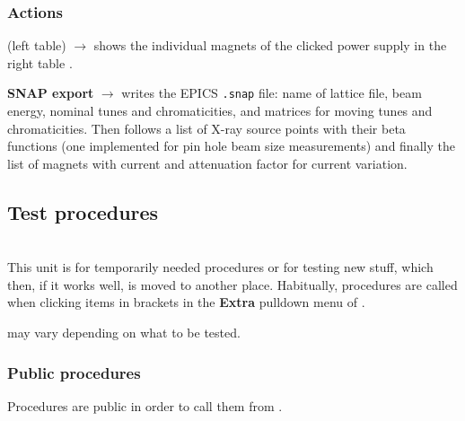 \documentclass[12pt]{article}
\newcommand\code[1]{{\tt #1}}
\newcommand{\ofld}[1]{\colorbox{black!15}{{{\color{black}\bf #1}}}}
\newcommand{\ofldx}[1]{\colorbox{black!15}{{\color{black}(#1)}}}
\newcommand\guico[1]{{\color{blue}\code{#1}}}
\newcommand{\evcod}[2]{\ofld{#1} $\rightarrow$ \guico{#2}}
\newcommand{\evcodx}[2]{\ofldx{#1} $\rightarrow$ \guico{#2}}
\newcommand{\opauni}[1]{\colorbox{orange!30}{{\color{black}\code{#1}}}}
\newcommand{\ounih}[2]{\subsection{\label{#2}#1}{\Huge\opauni{#2}}\\}
\newcommand{\ouni}[1]{\hyperref[#1]{\opauni{#1}}}
\newcommand{\uses}[1]{\flushleft {\bf Uses:} #1}
\newcommand{\desc}[1]{#1}
\newcommand{\act}[1]{\subsubsection*{Actions} #1}
\newcommand{\ppro}[1]{\subsubsection*{Public procedures} #1}
\begin{document}
\act{
\evcodx{left table}{cgridSelectCell} shows the individual magnets of the clicked power supply in the right table \guico{pgrid}.

\evcod{SNAP export}{busnapSLSClick} writes the EPICS \code{.snap} file: name of lattice file, beam energy, nominal tunes and chromaticities, and matrices for moving tunes and chromaticities. Then follows a list of X-ray source points with their beta functions (one implemented for pin hole beam size measurements) and finally the list of magnets with current and attenuation factor for current variation.
}




\ounih{Test procedures}{testcode} 

\desc{This unit is for temporarily needed procedures or for testing new stuff, which then, if it works well, is moved to another place. Habitually, procedures are called when clicking items in brackets in the \ofld{Extra} pulldown menu of \ouni{opamenu}.
}

\uses{ may vary depending on what to be tested.} 

\ppro{Procedures are public in order to call them from \ouni{opamenu}.}
\end{document}

